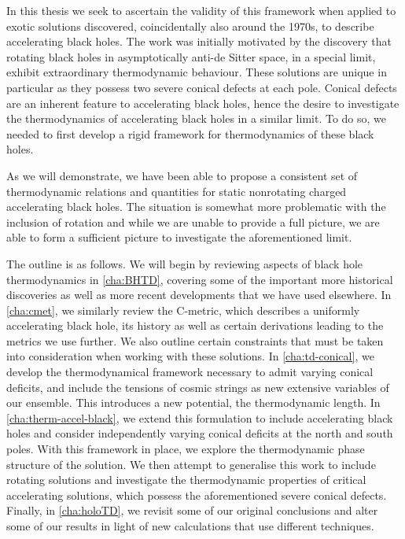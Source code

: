 \documentclass[
twoside,
openright,
frontopenright,
]{dmathesis}
\begin{document}
In this thesis we seek to ascertain the validity of this framework when applied
to exotic solutions discovered, coincidentally also around the 1970s, to
describe accelerating black holes. The work was initially motivated by the
discovery that rotating black holes in asymptotically anti-de Sitter space, in a
special limit, exhibit extraordinary thermodynamic behaviour. These solutions
are unique in particular as they possess two severe conical defects at each
pole. Conical defects are an inherent feature to accelerating black holes, hence
the desire to investigate the thermodynamics of accelerating black holes in a
similar limit. To do so, we needed to first develop a rigid framework for
thermodynamics of these black holes.

As we will demonstrate, we have been able to propose a consistent set of
thermodynamic relations and quantities for static nonrotating charged accelerating
black holes. The situation is somewhat more problematic with the inclusion of
rotation and while we are unable to provide a full picture, we are able to form
a sufficient picture to investigate the aforementioned limit.

The outline is as follows. We will begin by reviewing aspects of black hole
thermodynamics in \cref{cha:BHTD}, covering some of the important more
historical discoveries as well as more recent developments that we have used
elsewhere. In \cref{cha:cmet}, we similarly review the C-metric, which
describes a uniformly accelerating black hole, its history as well as certain
derivations leading to the metrics we use further. We also outline certain
constraints that must be taken into consideration when working with these
solutions. In \cref{cha:td-conical}, we develop the thermodynamical framework
necessary to admit varying conical deficits, and include the tensions of cosmic
strings as new extensive variables of our ensemble. This introduces a new
potential, the thermodynamic length. In \cref{cha:therm-accel-black}, we extend
this formulation to include accelerating black holes and consider independently
varying conical deficits at the north and south poles. With this framework in
place, we explore the thermodynamic phase structure of the solution. We then
attempt to generalise this work to include rotating solutions and investigate
the thermodynamic properties of critical accelerating solutions, which possess
the aforementioned severe conical defects. Finally, in \cref{cha:holoTD}, we
revisit some of our original conclusions and alter some of our results in light
of new calculations that use different techniques.
\end{document}
